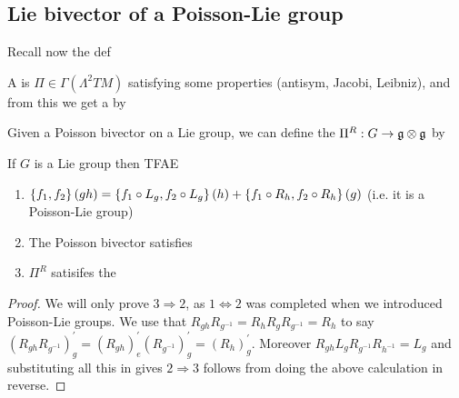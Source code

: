 \documentclass{article}
\begin{document}
\subsection{Lie bivector of a Poisson-Lie group}

Recall now the def 
\begin{definition}
A  is $\Pi \in \Gamma(\Lambda^2 TM)$ satisfying some properties (antisym, Jacobi, Leibniz), and from this we get a  by 
\end{definition}

\begin{definition}
Given a Poisson bivector on a Lie group, we can define the  $\Pi^R : G \to \mf{g} \otimes \mf{g}$ by 
\end{definition}

\begin{lemma}
If $G$ is a Lie group then TFAE 
\begin{enumerate}
    \item $\acomm[f_1]{f_2}(gh) = \acomm[f_1 \circ L_g]{f_2 \circ L_g}(h) + \acomm[f_1 \circ R_h]{f_2 \circ R_h}(g)$ (i.e. it is a Poisson-Lie group)
    \item The Poisson bivector satisfies 
    \item $\Pi^R$ satisifes the  
\end{enumerate}
\end{lemma}
\begin{proof}
We will only prove $3 \Rightarrow 2$, as $1 \Leftrightarrow 2$ was completed when we introduced Poisson-Lie groups. 
We use that $R_{gh}R_{g^{-1}} = R_h R_g R_{g^{-1}} = R_h $ to say $(R_{gh}R_{g^{-1}})^\prime_g = (R_{gh})^\prime_e (R_{g^{-1}})^\prime_g = (R_h)^\prime_g$. Moreover $R_{gh} L_g R_{g^{-1}} R_{h^{-1}} = L_g$ and substituting all this in gives 
$2 \Rightarrow 3$ follows from doing the above calculation in reverse. 
\end{proof}
\end{document}
